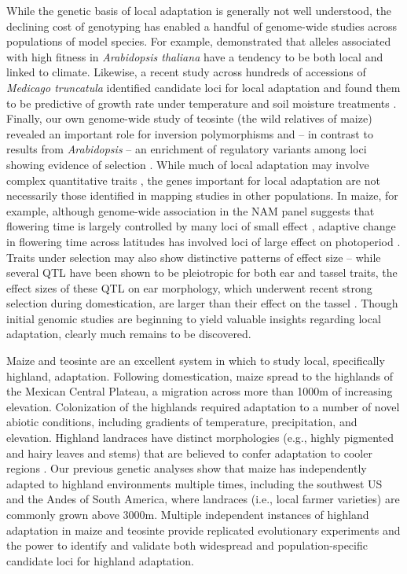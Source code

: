 While the genetic basis of local adaptation is generally not well understood, the declining cost of genotyping has enabled a handful of genome-wide studies across populations of model species.  For example, \citet{fournier2011map} demonstrated that alleles associated with high fitness in \emph{Arabidopsis thaliana} have a tendency to be both local and linked to climate.  Likewise, a recent study across hundreds of accessions of \emph{Medicago truncatula} identified candidate loci for local adaptation and found them to be predictive of growth rate under temperature and soil moisture treatments \citep{Yoder17012014}.  Finally, our own genome-wide study of teosinte (the wild relatives of maize) revealed  an important role for inversion polymorphisms and -- in contrast to results from \emph{Arabidopsis} \citep{hancock2011adaptation} -- an enrichment of regulatory variants among loci showing evidence of selection \citep{Pyhajarvi2013}. While much of local adaptation may involve complex quantitative traits \citep{le2012genetic}, the genes important for local adaptation are not necessarily those identified in mapping studies in other populations. In maize, for example, although genome-wide association in the NAM panel suggests that flowering time is largely controlled by many loci of small effect \citep{buckler2009genetic}, adaptive change in flowering time across latitudes has involved loci of large effect on photoperiod \citep{hung2012zmcct}. Traits under selection may also show distinctive patterns of effect size -- while several QTL have been shown to be pleiotropic for both ear and tassel traits, the effect sizes of these QTL on ear morphology, which underwent recent strong selection during domestication, are larger than their effect on the tassel \citep{Brown2011b}. Though initial genomic studies are beginning to yield valuable insights regarding local adaptation, clearly much remains to be discovered.  

Maize and teosinte are an excellent system in which to study local, specifically highland, adaptation.  Following domestication, maize spread to the highlands of the Mexican Central Plateau, a migration across more than 1000m of increasing elevation.  Colonization of the highlands required adaptation to a number of novel abiotic conditions, including gradients of temperature, precipitation, and elevation. Highland landraces have distinct morphologies (e.g., highly pigmented and hairy leaves and stems) that are believed to confer adaptation to cooler regions \citep{Doebley1984a}.  Our previous genetic analyses \citep{vanheerwaarden2011a} show that maize has independently adapted to highland environments multiple times, including the southwest US and the Andes of South America, where landraces (i.e., local farmer varieties) are commonly grown above 3000m. Multiple independent instances of highland adaptation in maize and teosinte provide replicated evolutionary experiments and the power to identify and validate both widespread and population-specific candidate loci for highland adaptation.

